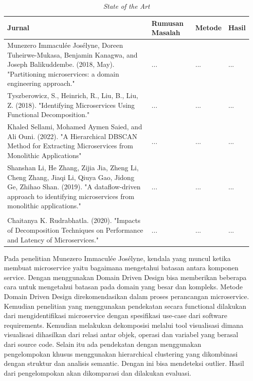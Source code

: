 \begingroup
\setlength{\LTleft}{-20cm plus -1fill}
\setlength{\LTright}{\LTleft}
\begin{small}
	\begin{longtable}{|p{3cm}|p{3.5cm}|p{3cm}|p{3.5cm}|}
		\caption{\textit{State of the Art}}\\
		\hline
		\textbf{Jurnal} & \textbf{Rumusan Masalah} & \textbf{Metode} & \textbf{Hasil}\\
		\endfirsthead
		\hline
		Munezero Immaculée Josélyne, Doreen Tuheirwe-Mukasa, Benjamin Kanagwa, and Joseph Balikuddembe. (2018, May). "Partitioning microservices: a domain engineering approach." \cite{11} &
		... &
		... &
		... 
		\\
		
		\hline
		Tyszberowicz, S., Heinrich, R., Liu, B., Liu, Z. (2018). "Identifying Microservices Using Functional Decomposition." \cite{12}  & 
		... &
		... &
	    ... 
		\\

		\hline
		Khaled Sellami, Mohamed Aymen Saied, and Ali Ouni. (2022). "A Hierarchical
		DBSCAN Method for Extracting Microservices from Monolithic Applications" \cite{13} &
		... &
	    ... &
		... 
		\\
		
		\hline
		Shanshan Li, He Zhang, Zijia Jia, Zheng Li, Cheng Zhang, Jiaqi Li, Qiuya Gao, Jidong Ge, Zhihao Shan. (2019). "A dataflow-driven approach to identifying microservices from monolithic applications."  \cite{14} &		  
		... &
		... &
		... 
		\\

		\label{tbl:StateoftheArt}\\

		\hline
		Chaitanya K. Rudrabhatla. (2020). "Impacts of Decomposition Techniques on Performance and Latency of Microservices."  \cite{3} &
		... &
		... &
		... 
		\\
		
	\end{longtable}
\end{small}
\endgroup
Pada penelitian Munezero Immaculée Josélyne, kendala yang muncul ketika membuat  microservice yaitu bagaimana mengetahui batasan antara komponen service. Dengan menggunakan Domain Driven Design bisa memberikan beberapa cara untuk mengetahui batasan pada domain yang besar dan kompleks. Metode Domain Driven Design direkomendasikan dalam proses perancangan microservice. \\

Kemudian penelitian yang menggunakan pendekatan secara functional dilakukan dari mengidentifikasi microservice dengan spesifikasi use-case dari software requirements. Kemudian melakukan dekomposisi melalui tool visualisasi dimana visualisasi dihasilkan dari relasi antar objek, operasi dan variabel yang berasal dari source code.
Selain itu ada pendekatan dengan menggunakan pengelompokan khusus menggunakan hierarchical clustering yang dikombinasi dengan struktur dan analisis semantic. Dengan ini bisa mendeteksi outlier. Hasil dari pengelompokan akan dikomparasi dan dilakukan evaluasi.\\

